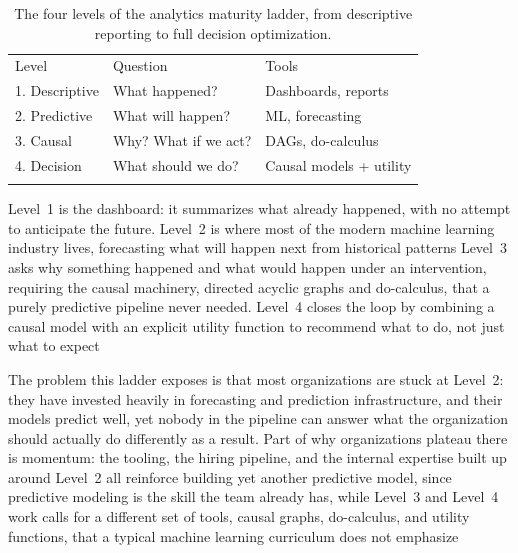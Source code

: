 \begin{table}[!t]
  \caption{The four levels of the analytics maturity ladder, from descriptive reporting
  to full decision optimization.}
  \label{tab:analytics-maturity-ladder}
  \begin{tabular}{p{2.3cm}p{4.1cm}p{4.9cm}}
    \hline
    \noalign{\smallskip} Level                                      & Question             & Tools                   \\
    \noalign{\smallskip}\svhline\noalign{\smallskip} 1. Descriptive & What happened?       & Dashboards, reports     \\
    2. Predictive                                                   & What will happen?    & ML, forecasting         \\
    3. Causal                                                       & Why? What if we act? & DAGs, do-calculus       \\
    4. Decision                                                     & What should we do?   & Causal models + utility \\
    \noalign{\smallskip}                                             \hline
    \noalign{\smallskip}
  \end{tabular}
\end{table}

Level~1 is the dashboard: it summarizes what already happened, with no attempt to
anticipate the future. Level~2 is where most of the modern machine learning
industry lives, forecasting what will happen next from historical patterns Level~3
asks why something happened and what would happen under an intervention,
requiring the causal machinery, directed acyclic graphs and do-calculus, that a
purely predictive pipeline never needed. Level~4 closes the loop by combining a causal
model with an explicit utility function to recommend what to do, not just what
to expect

The problem this ladder exposes is that most organizations are stuck at Level~2:
they have invested heavily in forecasting and prediction infrastructure, and their
models predict well, yet nobody in the pipeline can answer what the organization
should actually do differently as a result. Part of why organizations plateau there
is momentum: the tooling, the hiring pipeline, and the internal expertise built
up around Level~2 all reinforce building yet another predictive model, since predictive
modeling is the skill the team already has, while Level~3 and Level~4 work calls
for a different set of tools, causal graphs, do-calculus, and utility functions,
that a typical machine learning curriculum does not emphasize

